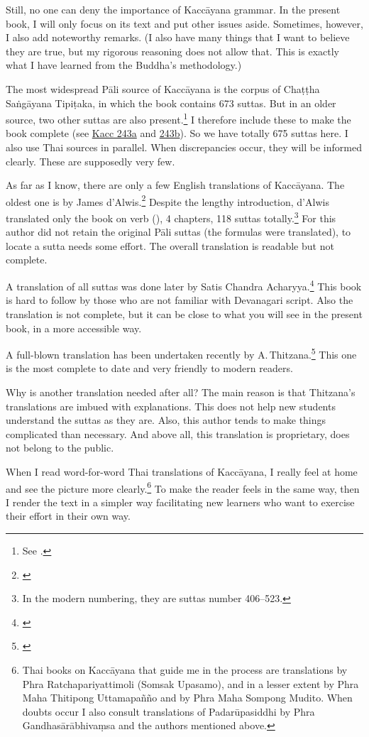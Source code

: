 Still, no one can deny the importance of Kaccāyana grammar. In the present book, I will only focus on its text and put other issues aside. Sometimes, however, I also add noteworthy remarks. (I also have many things that I want to believe they are true, but my rigorous reasoning does not allow that. This is exactly what I have learned from the Buddha's methodology.) 

The most widespread Pāli source of Kaccāyana is the corpus of Chaṭṭha Saṅgāyana Tipiṭaka, in which the book contains 673 suttas. But in an older source, two other suttas are also present.\footnote{See \citealp[p.~221]{thitzana:kacc1}.} I therefore include these to make the book complete (see \hyperref[sut:243a]{Kacc 243a} and \hyperref[sut:243b]{243b}). So we have totally 675 suttas here. I also use Thai sources in parallel. When discrepancies occur, they will be informed clearly. These are supposedly very few.

As far as I know, there are only a few English translations of Kaccāyana. The oldest one is by James d'Alwis.\footnote{\citealp{dalwis:kach}} Despite the lengthy introduction, d'Alwis translated only the book on verb (), 4 chapters, 118 suttas totally.\footnote{In the modern numbering, they are suttas number 406--523.} For this author did not retain the original Pāli suttas (the formulas were translated), to locate a sutta needs some effort. The overall translation is readable but not complete.

A translation of all suttas was done later by Satis Chandra Acharyya.\footnote{\citealp{satis:kacc}} This book is hard to follow by those who are not familiar with Devanagari script. Also the translation is not complete, but it can be close to what you will see in the present book, in a more accessible way.

A full-blown translation has been undertaken recently by A.\,Thitzana.\footnote{\citealp{thitzana:kacc2}} This one is the most complete to date and very friendly to modern readers.

Why is another translation needed after all? The main reason is that Thitzana's translations are imbued with explanations. This does not help new students understand the suttas as they are. Also, this author tends to make things complicated than necessary. And above all, this translation is proprietary, does not belong to the public.

When I read word-for-word Thai translations of Kaccāyana, I really feel at home and see the picture more clearly.\footnote{Thai books on Kaccāyana that guide me in the process are translations by Phra Ratchapariyattimoli (Somsak Upasamo), and in a lesser extent by Phra Maha Thitipong Uttamapañño and by Phra Maha Sompong Mudito. When doubts occur I also consult translations of Padarūpasiddhi by Phra Gandhasārābhivaṃsa and the authors mentioned above.} To make the reader feels in the same way, then I render the text in a simpler way facilitating new learners who want to exercise their effort in their own way.


